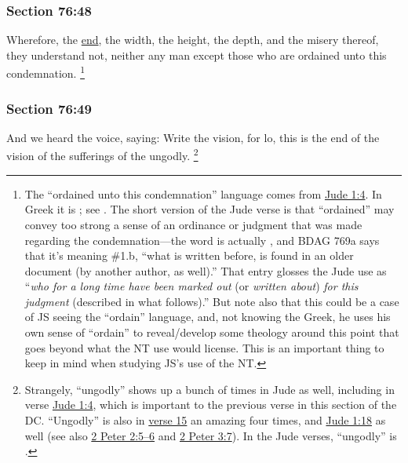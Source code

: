 	\subsubsection{Section 76:48} %
		\label{DC76-48}

		Wherefore, the \hyperref[END]{end}, the width, the height, the depth, and the misery thereof, they understand not, neither any man except those who are ordained unto this condemnation.%
			\footnote{%
				The ``ordained unto this condemnation'' language comes from \hyperref[JUDE-1-4]{Jude 1:4}. In Greek it is ; see \hyperref[KRIMA]{}. The short version of the Jude verse is that ``ordained'' may convey too strong a sense of an ordinance or judgment that was made regarding the condemnation---the word is actually , and BDAG 769a says that it's meaning \#1.b, ``what is written before, is found in an older document (by another author, as well).'' That entry glosses the Jude use as ``\textit{who for a long time have been marked out} (or \textit{written about}) \textit{for this judgment} (described in what follows).'' But note also that this could be a case of JS seeing the ``ordain'' language, and, not knowing the Greek, he uses his own sense of ``ordain'' to reveal/develop some theology around this point that goes beyond what the NT use would license. This is an important thing to keep in mind when studying JS's use of the NT.
				}


	\subsubsection{Section 76:49} %
		\label{DC76-49}

		And we heard the voice, saying: Write the vision, for lo, this is the end of the vision of the sufferings of the ungodly.%
			\footnote{%
				Strangely, ``ungodly'' shows up a bunch of times in Jude as well, including in verse \hyperref[JUDE-1-4]{Jude 1:4}, which is important to the previous verse in this section of the DC. ``Ungodly'' is also in \hyperref[JUDE-1-15]{verse 15} an amazing four times, and \hyperref[JUDE-1-18]{Jude 1:18} as well (see also \hyperref[2PETER-2-5]{2 Peter 2:5--6} and \hyperref[2PETER-3-7]{2 Peter 3:7}). In the Jude verses, ``ungodly'' is \hyperref[ASEBES]{}.
				}

